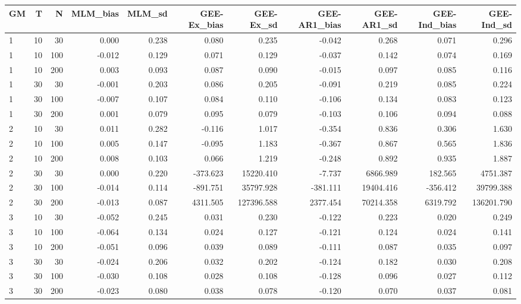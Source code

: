 \begin{table}[ht]
\centering
\begin{tabular}{lrrrrrrrrrr}
  \hline
GM & T & N & MLM\_bias & MLM\_sd & GEE-Ex\_bias & GEE-Ex\_sd & GEE-AR1\_bias & GEE-AR1\_sd & GEE-Ind\_bias & GEE-Ind\_sd \\ 
  \hline
1 & 10 & 30 & 0.000 & 0.238 & 0.080 & 0.235 & -0.042 & 0.268 & 0.071 & 0.296 \\ 
  1 & 10 & 100 & -0.012 & 0.129 & 0.071 & 0.129 & -0.037 & 0.142 & 0.074 & 0.169 \\ 
  1 & 10 & 200 & 0.003 & 0.093 & 0.087 & 0.090 & -0.015 & 0.097 & 0.085 & 0.116 \\ 
  1 & 30 & 30 & -0.001 & 0.203 & 0.086 & 0.205 & -0.091 & 0.219 & 0.085 & 0.224 \\ 
  1 & 30 & 100 & -0.007 & 0.107 & 0.084 & 0.110 & -0.106 & 0.134 & 0.083 & 0.123 \\ 
  1 & 30 & 200 & 0.001 & 0.079 & 0.095 & 0.079 & -0.103 & 0.106 & 0.094 & 0.088 \\ 
  2 & 10 & 30 & 0.011 & 0.282 & -0.116 & 1.017 & -0.354 & 0.836 & 0.306 & 1.630 \\ 
  2 & 10 & 100 & 0.005 & 0.147 & -0.095 & 1.183 & -0.367 & 0.867 & 0.565 & 1.836 \\ 
  2 & 10 & 200 & 0.008 & 0.103 & 0.066 & 1.219 & -0.248 & 0.892 & 0.935 & 1.887 \\ 
  2 & 30 & 30 & 0.000 & 0.220 & -373.623 & 15220.410 & -7.737 & 6866.989 & 182.565 & 4751.387 \\ 
  2 & 30 & 100 & -0.014 & 0.114 & -891.751 & 35797.928 & -381.111 & 19404.416 & -356.412 & 39799.388 \\ 
  2 & 30 & 200 & -0.013 & 0.087 & 4311.505 & 127396.588 & 2377.454 & 70214.358 & 6319.792 & 136201.790 \\ 
  3 & 10 & 30 & -0.052 & 0.245 & 0.031 & 0.230 & -0.122 & 0.223 & 0.020 & 0.249 \\ 
  3 & 10 & 100 & -0.064 & 0.134 & 0.024 & 0.127 & -0.121 & 0.124 & 0.024 & 0.141 \\ 
  3 & 10 & 200 & -0.051 & 0.096 & 0.039 & 0.089 & -0.111 & 0.087 & 0.035 & 0.097 \\ 
  3 & 30 & 30 & -0.024 & 0.206 & 0.032 & 0.202 & -0.124 & 0.182 & 0.030 & 0.208 \\ 
  3 & 30 & 100 & -0.030 & 0.108 & 0.028 & 0.108 & -0.128 & 0.096 & 0.027 & 0.112 \\ 
  3 & 30 & 200 & -0.023 & 0.080 & 0.038 & 0.078 & -0.120 & 0.070 & 0.037 & 0.081 \\ 

\end{tabular}
\end{table}
